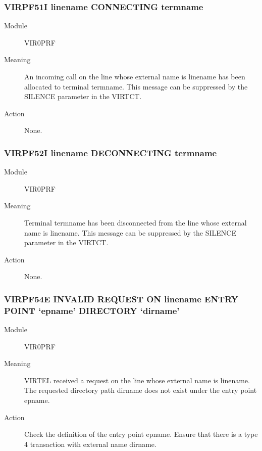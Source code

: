 \documentclass[letterpaper,10pt,english]{sphinxmanual}
\begin{document}
\subsubsection{VIRPF51I linename CONNECTING termname}
\label{\detokenize{messages:virpf51i-linename-connecting-termname}}\begin{description}
\item[{Module}] \leavevmode
VIR0PRF

\item[{Meaning}] \leavevmode
An incoming call on the line whose external name is linename has been allocated to terminal termname. This message can be suppressed by the SILENCE parameter in the VIRTCT.

\item[{Action}] \leavevmode
None.

\end{description}


\subsubsection{VIRPF52I linename DECONNECTING termname}
\label{\detokenize{messages:virpf52i-linename-deconnecting-termname}}\begin{description}
\item[{Module}] \leavevmode
VIR0PRF

\item[{Meaning}] \leavevmode
Terminal termname has been disconnected from the line whose external name is linename. This message can be suppressed by the SILENCE parameter in the VIRTCT.

\item[{Action}] \leavevmode
None.

\end{description}


\subsubsection{VIRPF54E INVALID REQUEST ON linename ENTRY POINT ‘epname’ DIRECTORY ‘dirname’}
\label{\detokenize{messages:virpf54e-invalid-request-on-linename-entry-point-epname-directory-dirname}}\begin{description}
\item[{Module}] \leavevmode
VIR0PRF

\item[{Meaning}] \leavevmode
VIRTEL received a request on the line whose external name is linename. The requested directory path dirname does not exist under the entry point epname.

\item[{Action}] \leavevmode
Check the definition of the entry point epname. Ensure that there is a type 4 transaction with external name dirname.

\end{description}
\end{document}
